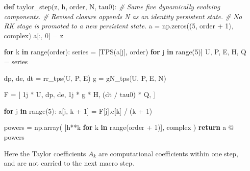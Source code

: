 \documentclass[
  a4paper,
]{article}
\newenvironment{Shaded}{}{}
\newcommand{\BuiltInTok}[1]{\textcolor[rgb]{0.00,0.50,0.00}{#1}}
\newcommand{\CommentTok}[1]{\textcolor[rgb]{0.38,0.63,0.69}{\textit{#1}}}
\newcommand{\ControlFlowTok}[1]{\textcolor[rgb]{0.00,0.44,0.13}{\textbf{#1}}}
\newcommand{\DecValTok}[1]{\textcolor[rgb]{0.25,0.63,0.44}{#1}}
\newcommand{\KeywordTok}[1]{\textcolor[rgb]{0.00,0.44,0.13}{\textbf{#1}}}
\newcommand{\NormalTok}[1]{#1}
\newcommand{\OperatorTok}[1]{\textcolor[rgb]{0.40,0.40,0.40}{#1}}
\newcommand{\OtherTok}[1]{\textcolor[rgb]{0.00,0.44,0.13}{#1}}
\begin{document}
\begin{Shaded}
\begin{Highlighting}[]
\KeywordTok{def}\NormalTok{ taylor\_step(z, h, order, N, tau0):}
    \CommentTok{\# Same five dynamically evolving components.}
    \CommentTok{\# Revised closure appends N as an identity persistent state.}
    \CommentTok{\# No RK stage is promoted to a new persistent state.}
\NormalTok{    a }\OperatorTok{=}\NormalTok{ np.zeros((}\DecValTok{5}\NormalTok{, order }\OperatorTok{+} \DecValTok{1}\NormalTok{), }\BuiltInTok{complex}\NormalTok{)}
\NormalTok{    a[:, }\DecValTok{0}\NormalTok{] }\OperatorTok{=}\NormalTok{ z}

    \ControlFlowTok{for}\NormalTok{ k }\KeywordTok{in} \BuiltInTok{range}\NormalTok{(order):}
\NormalTok{        series }\OperatorTok{=}\NormalTok{ [TPS(a[j], order) }\ControlFlowTok{for}\NormalTok{ j }\KeywordTok{in} \BuiltInTok{range}\NormalTok{(}\DecValTok{5}\NormalTok{)]}
\NormalTok{        U, P, E, H, Q }\OperatorTok{=}\NormalTok{ series}

\NormalTok{        dp, de, dt }\OperatorTok{=}\NormalTok{ rr\_tps(U, P, E)}
\NormalTok{        g }\OperatorTok{=}\NormalTok{ gN\_tps(U, P, E, N)}

\NormalTok{        F }\OperatorTok{=}\NormalTok{ [}
            \OtherTok{1j} \OperatorTok{*}\NormalTok{ U,}
\NormalTok{            dp,}
\NormalTok{            de,}
            \OtherTok{1j} \OperatorTok{*}\NormalTok{ g }\OperatorTok{*}\NormalTok{ H,}
\NormalTok{            (dt }\OperatorTok{/}\NormalTok{ tau0) }\OperatorTok{*}\NormalTok{ Q,}
\NormalTok{        ]}

        \ControlFlowTok{for}\NormalTok{ j }\KeywordTok{in} \BuiltInTok{range}\NormalTok{(}\DecValTok{5}\NormalTok{):}
\NormalTok{            a[j, k }\OperatorTok{+} \DecValTok{1}\NormalTok{] }\OperatorTok{=}\NormalTok{ F[j].c[k] }\OperatorTok{/}\NormalTok{ (k }\OperatorTok{+} \DecValTok{1}\NormalTok{)}

\NormalTok{    powers }\OperatorTok{=}\NormalTok{ np.array(}
\NormalTok{        [h}\OperatorTok{**}\NormalTok{k }\ControlFlowTok{for}\NormalTok{ k }\KeywordTok{in} \BuiltInTok{range}\NormalTok{(order }\OperatorTok{+} \DecValTok{1}\NormalTok{)],}
        \BuiltInTok{complex}
\NormalTok{    )}
    \ControlFlowTok{return}\NormalTok{ a }\OperatorTok{@}\NormalTok{ powers}
\end{Highlighting}
\end{Shaded}

Here the Taylor coefficients \(A_k\) are computational coefficients
within one step, and are not carried to the next macro step.
\end{document}

